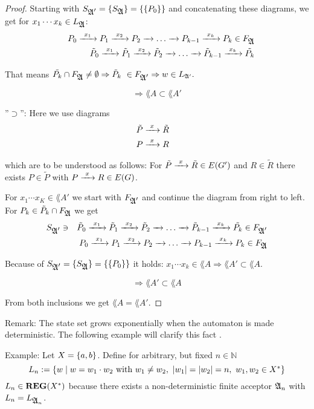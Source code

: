 \begin{proof}
Starting with $S_{\mbox{$\mathfrak{A'}$}} = \mbox{$\{S_{\mbox{$\mathfrak{A}$}}\}$} = \mbox{$\{\mbox{$\{P_0 \}$}\}$}$ and
concatenating these diagrams, we get for $x_1 \cdots x_k \in
L_{\mbox{$\mathfrak{A}$}}$:
\begin{eqnarray*}
 & & P_0 \xrightarrow{\ {x_1}\ } P_1 \xrightarrow{\ {x_2}\ } P_2 \xrightarrow{\ {}\ } \ldots \xrightarrow{\ {}\ } P_{k-1} \xrightarrow{\ {x_k}\ }
 P_k \in F_{\mbox{$\mathfrak{A}$}} \\
 & & \tilde{P}_0 \xrightarrow{\ {x_1}\ } \tilde{P}_1 \xrightarrow{\ {x_2}\ } \tilde{P}_2 \xrightarrow{\ {}\ } \ldots
 \xrightarrow{\ {}\ } \tilde{P}_{k-1} \xrightarrow{\ {x_k}\ } \tilde{P_k}
\end{eqnarray*}

That means $\tilde{P_k} \cap F_{\mbox{$\mathfrak{A}$}} \neq \emptyset \Rightarrow \tilde{P}_k \
\in F_{\mbox{$\mathfrak{A'}$}} \Rightarrow w \in \mbox{$L_{\mathfrak{A'}}$}.$

\[ \Rightarrow \lang{A} \subset \lang{A'}\]

''$\supset$'': Here we use diagrams  
\begin{eqnarray*}
& \tilde{P} \xrightarrow{\ {x}\ } \tilde{R} & \\
& P \xrightarrow{\ {x}\ } R & 
\end{eqnarray*}

which are to be understood as follows: For $\tilde{P} \xrightarrow{\ {x}\ } \tilde{R} \in
E(G')$ and $R \in \tilde{R}$ there exists $P \in \tilde{P}$ with $P \xrightarrow{\ {x}\ } R
\in E(G)$.

For $x_1 \cdots x_K \in \lang{A'}$ we start with $F_{\mbox{$\mathfrak{A'}$}}$ and continue
the diagram from right to left. For $P_k \in \tilde{P}_k \cap F_{\mbox{$\mathfrak{A}$}}$ we get
\begin{eqnarray*}
 & S_{\mbox{$\mathfrak{A'}$}} \ni & \tilde{P}_0 \xrightarrow{\ {x_1}\ } \tilde{P}_1 \xrightarrow{\ {x_2}\ } \tilde{P}_2 \xrightarrow{\ {}\ } \ldots
 \xrightarrow{\ {}\ } \tilde{P}_{k-1} \xrightarrow{\ {x_k}\ } \tilde{P_k} \in F_{\mbox{$\mathfrak{A'}$}} \\
 & & P_0 \xrightarrow{\ {x_1}\ } P_1 \xrightarrow{\ {x_2}\ } P_2 \xrightarrow{\ {}\ } \ldots \xrightarrow{\ {}\ }
 P_{k-1} \xrightarrow{\ {x_k}\ } P_k \in F_{\mbox{$\mathfrak{A}$}} 
\end{eqnarray*}

Because of $S_{\mbox{$\mathfrak{A'}$}} = \mbox{$\{S_{\mbox{$\mathfrak{A}$}}\}$} = \mbox{$\{\mbox{$\{P_0\}$}\}$}$ it holds:
$x_1 \cdots x_k \in \lang{A} \Rightarrow \lang{A'} \subset \lang{A}$.

\[ \Rightarrow \lang{A'} \subset \lang{A}\]

From both inclusions we get $\lang{A} = \lang{A'}$.
\end{proof}

\bigskip
Remark: The state set grows exponentially when the automaton is made
deterministic. The following example will clarify this fact \cite{Commentz}.

\bigskip
Example: Let $X = \mbox{$\{a, b\}$}$. Define for arbitrary, but fixed $n \in
\mathbb{N}$ \[ L_n := \mbox{$\{w \mid w = w_1 \cdot w_2 \mbox{ with } w_1 \neq
w_2,\ |w_1| = |w_2| = n,\ w_1, w_2 \in X^*\}$} 
\]
$L_n \in \mbox{{\bf REG}}(X^*)$ because there exists a non-deterministic finite acceptor
$\mbox{$\mathfrak{A}$}_{n}$ with $L_n = L_{\mbox{$\mathfrak{A}$}_{n}}$.

